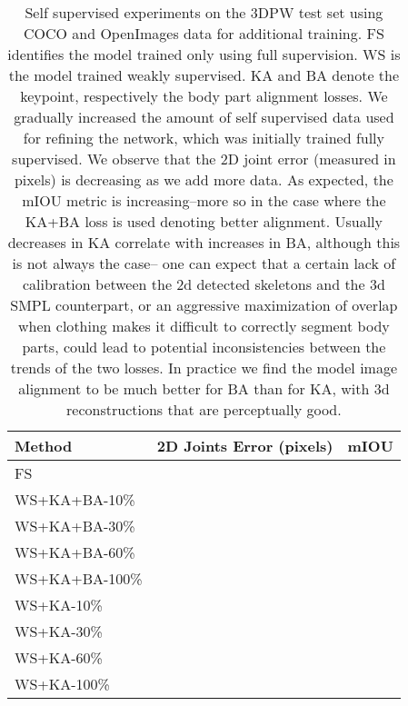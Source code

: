 \documentclass[runningheads]{llncs}
\begin{document}
\begin{table}[!htbp]
    \begin{tabular}[t]{|l|r|r|}
    \hline
    Method & 2D Joints Error (pixels) & mIOU \\
    \hline
    FS &  &  \\
    \hline    
    WS+KA+BA-10\% &  &  \\    
    \hline
    WS+KA+BA-30\% &  &  \\    
    \hline
    WS+KA+BA-60\% &  &  \\    
    \hline
    WS+KA+BA-100\% &  &  \\
    \hline
    WS+KA-10\% &  &  \\
    \hline
    WS+KA-30\% &  &  \\  
    \hline
    WS+KA-60\% &  &  \\
    \hline
    WS+KA-100\% &  &  \\
    \hline
    \end{tabular}
{
\caption{\small Self supervised experiments on the 3DPW test set using COCO and OpenImages data for additional training. FS identifies the model trained only using full supervision. WS is the model trained weakly supervised. KA and BA denote the keypoint, respectively the body part alignment losses. We gradually increased the amount of self supervised data used for refining the network, which was initially trained fully supervised. We observe that the 2D joint error (measured in pixels) is decreasing as we add more data. As expected, the mIOU metric is increasing--more so in the case where the KA+BA loss is used denoting better alignment. Usually decreases in KA correlate with increases in BA, although this is not always the case-- one can expect that a certain lack of calibration between the 2d detected skeletons and the 3d SMPL counterpart, or an aggressive maximization of overlap when clothing makes it difficult to correctly segment body parts, could lead to potential inconsistencies between the trends of the two losses. In practice we find the model image alignment to be much better for BA than for KA, with 3d reconstructions that are perceptually good. 
}
}
\label{tbl:ssupervised-experiments2}
\end{table}


\end{document}
